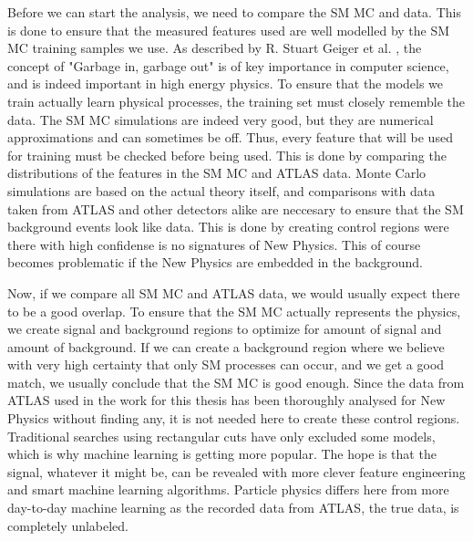 Before we can start the analysis, we need to compare the SM MC and data. This is done to ensure that the measured features used 
are well modelled by the SM MC training samples we use. As described by R. Stuart Geiger et al. \cite{DBLP:journals/corr/abs-2107-02278}, the concept of "Garbage 
in, garbage out" is of key importance in computer science, and is indeed important in high energy physics. To ensure that the models 
we train actually learn physical processes, the training set must closely rememble the data. The SM MC simulations are indeed very good, 
but they are numerical approximations and can 
sometimes be off. Thus, every feature that will be used for training must be checked before being used. This is done by 
comparing the distributions of the features in the SM MC and ATLAS data. Monte Carlo simulations are based on the actual theory 
itself, and comparisons with data taken from ATLAS and other detectors alike are neccesary to ensure that the SM background 
events look like data. This is done by creating control regions were there with high confidense is no signatures of New Physics. 
This of course becomes problematic if the New Physics are embedded in the background.\par
Now, if we compare all SM MC and ATLAS data, we would usually expect there to be a good overlap. To ensure that the SM MC actually 
represents the physics, we create signal and background regions to optimize for amount of signal and amount of background. If we can 
create a background region where we believe with very high certainty that only SM processes can occur, and we get a good match, 
we usually conclude that the SM MC is good enough. Since the data from ATLAS used in the work for this thesis has been thoroughly 
analysed for New Physics without finding any, it is not needed here to create these control regions. Traditional searches using 
rectangular cuts have only excluded some models, which is why machine learning is getting more popular. The hope is that the signal, 
whatever it might be, can be revealed with more clever feature engineering and smart machine learning algorithms. 
Particle physics differs here from more day-to-day machine learning as the recorded data from ATLAS, the true data, is completely 
unlabeled. 


